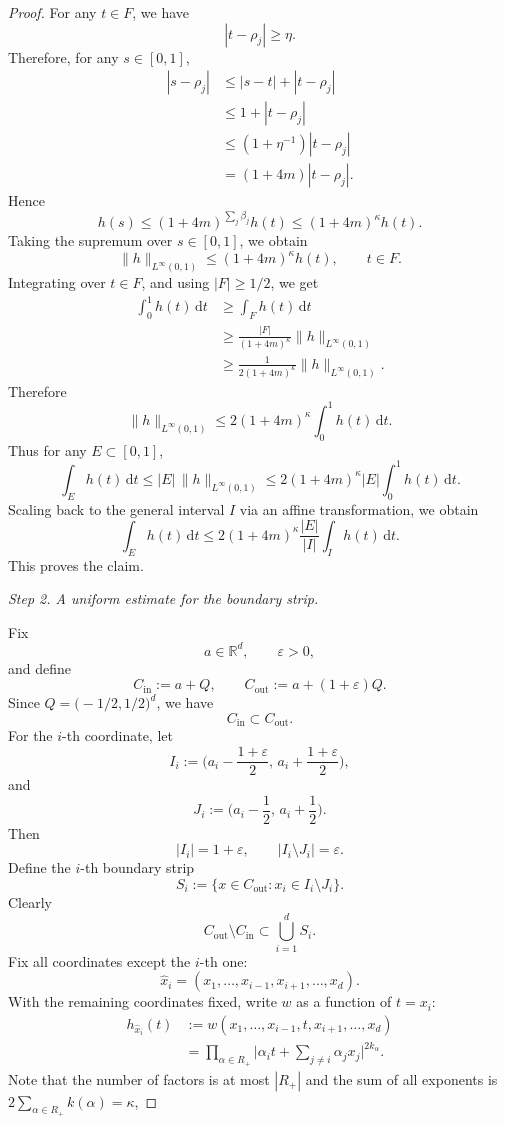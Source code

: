 \documentclass[12pt]{article}
\begin{document}
\begin{proof}
For any $t\in F$, we have
\[
|t-\rho_j|\ge \eta.
\]
Therefore, for any $s\in[0,1]$,
\[
\begin{aligned}
|s-\rho_j| &\le |s-t|+|t-\rho_j| \\
&\le 1+|t-\rho_j| \\
&\le (1+\eta^{-1})|t-\rho_j| \\
&=(1+4m)|t-\rho_j|.
\end{aligned}
\]
Hence
\[
h(s)\le (1+4m)^{\sum_j\beta_j}h(t)\le (1+4m)^{\kappa}h(t).
\]
Taking the supremum over $s\in[0,1]$, we obtain
\[
\|h\|_{L^{\infty}(0,1)}\le (1+4m)^{\kappa}h(t),\qquad t\in F.
\]
Integrating over $t\in F$, and using $|F|\ge 1/2$, we get
\[
\begin{aligned}
\int_{0}^{1}h(t)\,\mathrm{d}t &\ge \int_{F}h(t)\,\mathrm{d}t \\
&\ge \frac{|F|}{(1+4m)^{\kappa}}\|h\|_{L^{\infty}(0,1)} \\
&\ge \frac{1}{2(1+4m)^{\kappa}}\|h\|_{L^{\infty}(0,1)}.
\end{aligned}
\]
Therefore
\[
\|h\|_{L^{\infty}(0,1)}\le 2(1+4m)^{\kappa}\int_{0}^{1}h(t)\,\mathrm{d}t.
\]
Thus for any $E\subset [0,1]$,
\[
\int_{E} h(t)\,\mathrm{d}t \le |E|\,\|h\|_{L^{\infty}(0,1)}
\le 2(1+4m)^{\kappa}|E|\int_{0}^{1} h(t)\,\mathrm{d}t.
\]
Scaling back to the general interval $I$ via an affine transformation, we obtain
\[
\int_{E} h(t)\,\mathrm{d}t \le 2(1+4m)^{\kappa}\frac{|E|}{|I|}\int_{I} h(t)\,\mathrm{d}t.
\]
This proves the claim.

\emph{Step 2. A uniform estimate for the boundary strip.}

Fix
\[
a\in\mathbb{R}^d,\qquad \varepsilon>0,
\]
and define
\[
C_{\mathrm{in}}:=a+Q,\qquad C_{\mathrm{out}}:=a+(1+\varepsilon)Q.
\]
Since $Q=\bigl(-1/2,1/2\bigr)^d$, we have
\begin{equation}\label{EPL05}
C_{\mathrm{in}}\subset C_{\mathrm{out}}.
\end{equation}
For the $i$-th coordinate, let
\[
I_i:=\biggl(a_i-\frac{1+\varepsilon}{2},\,a_i+\frac{1+\varepsilon}{2}\biggr),
\]
and
\[
J_i:=\biggl(a_i-\frac12,\,a_i+\frac12\biggr).
\]
Then
\[
|I_i|=1+\varepsilon,\qquad |I_i\setminus J_i|=\varepsilon.
\]
Define the $i$-th boundary strip
\[
S_i:=\{x\in C_{\mathrm{out}}: x_i\in I_i\setminus J_i\}.
\]
Clearly
\begin{equation}
C_{\mathrm{out}}\setminus C_{\mathrm{in}}\subset \bigcup_{i=1}^{d} S_i.
\end{equation}
Fix all coordinates except the $i$-th one:
\[
\widehat{x}_i = (x_1,\dots,x_{i-1},x_{i+1},\dots,x_d).
\]
With the remaining coordinates fixed, write $w$ as a function of $t=x_i$:
\[
\begin{aligned}
h_{\widehat{x}_i}(t) &:= w(x_1,\dots,x_{i-1},t,x_{i+1},\dots,x_d) \\
&= \prod_{\alpha\in R_+} \biggl| \alpha_i t + \sum_{j\neq i}\alpha_j x_j \biggr|^{2k_\alpha}.
\end{aligned}
\]
Note that the number of factors is at most $|R_+|$ and the sum of all exponents is $2\sum_{\alpha\in R_+} k(\alpha)=\kappa$,


\end{proof}
\end{document}
